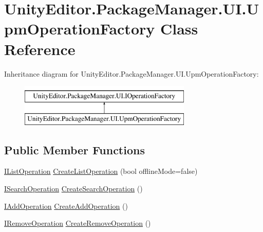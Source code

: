 \hypertarget{class_unity_editor_1_1_package_manager_1_1_u_i_1_1_upm_operation_factory}{}\section{Unity\+Editor.\+Package\+Manager.\+U\+I.\+Upm\+Operation\+Factory Class Reference}
\label{class_unity_editor_1_1_package_manager_1_1_u_i_1_1_upm_operation_factory}
Inheritance diagram for Unity\+Editor.\+Package\+Manager.\+U\+I.\+Upm\+Operation\+Factory\+:\begin{figure}[H]
\begin{center}
\leavevmode
\includegraphics[height=2.000000cm]{class_unity_editor_1_1_package_manager_1_1_u_i_1_1_upm_operation_factory}
\end{center}
\end{figure}
\subsection*{Public Member Functions}
\begin{DoxyCompactItemize}
\item 
\mbox{\hyperlink{interface_unity_editor_1_1_package_manager_1_1_u_i_1_1_i_list_operation}{I\+List\+Operation}} \mbox{\hyperlink{class_unity_editor_1_1_package_manager_1_1_u_i_1_1_upm_operation_factory_ac7d8532219c1ee8dbb59a15175d5944a}{Create\+List\+Operation}} (bool offline\+Mode=false)
\item 
\mbox{\hyperlink{interface_unity_editor_1_1_package_manager_1_1_u_i_1_1_i_search_operation}{I\+Search\+Operation}} \mbox{\hyperlink{class_unity_editor_1_1_package_manager_1_1_u_i_1_1_upm_operation_factory_a49788149061bc550315ab55adb0a89d8}{Create\+Search\+Operation}} ()
\item 
\mbox{\hyperlink{interface_unity_editor_1_1_package_manager_1_1_u_i_1_1_i_add_operation}{I\+Add\+Operation}} \mbox{\hyperlink{class_unity_editor_1_1_package_manager_1_1_u_i_1_1_upm_operation_factory_a567651d9dbfbb83813ae45768ab31e4e}{Create\+Add\+Operation}} ()
\item 
\mbox{\hyperlink{interface_unity_editor_1_1_package_manager_1_1_u_i_1_1_i_remove_operation}{I\+Remove\+Operation}} \mbox{\hyperlink{class_unity_editor_1_1_package_manager_1_1_u_i_1_1_upm_operation_factory_ab996d83fd2c343c982c264fdf046ab90}{Create\+Remove\+Operation}} ()
\end{DoxyCompactItemize}


